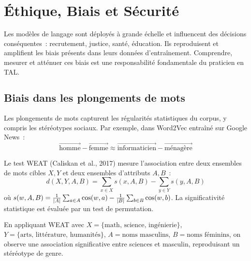 \chapter{\'Ethique, Biais et S\'ecurit\'e}
\label{ch:ethique}

\begin{intuition}[title=\textbf{Responsabilit\'e en TAL}]
Les mod\`eles de langage sont d\'eploy\'es \`a grande \'echelle et
influencent des d\'ecisions cons\'equentes~: recrutement, justice,
sant\'e, \'education. Ils reproduisent et amplifient les biais pr\'esents
dans leurs donn\'ees d'entra\^inement. Comprendre, mesurer et att\'enuer
ces biais est une responsabilit\'e fondamentale du praticien en TAL.
\end{intuition}

\section{Biais dans les plongements de mots}
\label{sec:ethique:embeddings}

\begin{definition}
Les plongements de mots capturent les r\'egularit\'es statistiques du
corpus, y compris les st\'er\'eotypes sociaux. Par exemple, dans
Word2Vec entra\^in\'e sur Google News~:
\[
    \vec{\text{homme}} - \vec{\text{femme}} \approx
    \vec{\text{informaticien}} - \vec{\text{m\'enag\`ere}}
\]
\end{definition}

\begin{theoreme}
Le test WEAT (Caliskan et al., 2017) mesure l'association entre deux
ensembles de mots cibles $X, Y$ et deux ensembles d'attributs $A, B$~:
\[
    d(X, Y, A, B) = \sum_{x \in X} s(x, A, B) - \sum_{y \in Y} s(y, A, B)
\]
o\`u $s(w, A, B) = \frac{1}{\left| A \right|} \sum_{a \in A} \cos(w, a)
- \frac{1}{\left| B \right|} \sum_{b \in B} \cos(w, b)$.
La significativit\'e statistique est \'evalu\'ee par un test de
permutation.
\end{theoreme}

\begin{exemple}
En appliquant WEAT avec $X = \{\text{math, science, ing\'enierie}\}$,
$Y = \{\text{arts, litt\'erature, humanit\'es}\}$,
$A = \text{noms masculins}$, $B = \text{noms f\'eminins}$, on observe
une association significative entre sciences et masculin, reproduisant
un st\'er\'eotype de genre.
\end{exemple}

